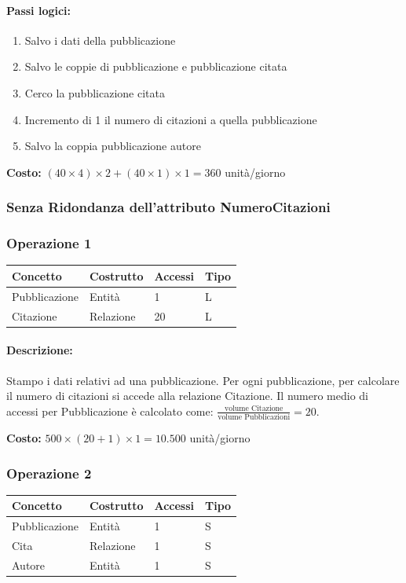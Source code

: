 \documentclass[a4paper,12pt]{article}
\begin{document}
\paragraph{Passi logici:}
\begin{enumerate}[label=\textbf{\arabic*)}, start=1, leftmargin=1.5cm]
    \item Salvo i dati della pubblicazione
    \item Salvo le coppie di pubblicazione e pubblicazione citata
    \item Cerco la pubblicazione citata
    \item Incremento di 1 il numero di citazioni a quella pubblicazione
    \item Salvo la coppia pubblicazione autore
\end{enumerate}

\textbf{Costo:} $(40 \times 4) \times 2 + (40 \times 1) \times 1 = 360$ unità/giorno

\subsubsection{Senza Ridondanza dell'attributo NumeroCitazioni} 

\subsubsection*{Operazione 1}
\begin{tabular}{llll}
\toprule
\textbf{Concetto} & \textbf{Costrutto} & \textbf{Accessi} & \textbf{Tipo} \\
\midrule
Pubblicazione & Entità    & 1  & L \\
Citazione     & Relazione & 20 & L \\
\bottomrule
\end{tabular}

\paragraph{Descrizione:} 
Stampo i dati relativi ad una pubblicazione. Per ogni pubblicazione, per calcolare il numero di citazioni si accede alla relazione Citazione. Il numero medio di accessi per Pubblicazione è calcolato come: $\frac{\text{volume Citazione}}{\text{volume Pubblicazioni}} = 20$.

\medskip
\textbf{Costo:} $500 \times (20 + 1) \times 1 = 10.500$ unità/giorno

\subsubsection*{Operazione 2}
\begin{tabular}{llll}
\toprule
\textbf{Concetto} & \textbf{Costrutto} & \textbf{Accessi} & \textbf{Tipo} \\
\midrule
Pubblicazione & Entità & 1 & S \\
Cita          & Relazione & 1 & S \\
Autore        & Entità & 1 & S \\
\bottomrule
\end{tabular}
\end{document}
